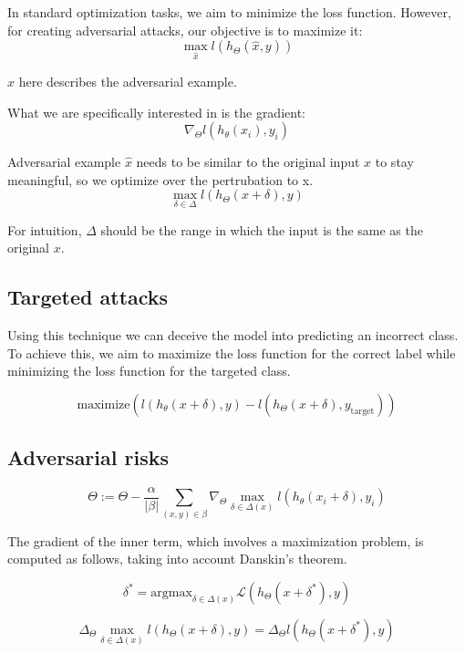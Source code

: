 In standard optimization tasks, we aim to minimize the loss function. However, for creating adversarial attacks, our objective is to maximize it:
\[\max_{\hat{x}} l(h_{\Theta}(\hat{x}, y))\]

$\hat x$ here describes the adversarial example.

What we are specifically interested in is the gradient:
\[  \nabla_\Theta l (h_{\theta}(x_{i}), y_{i}) \]

Adversarial example $\hat{x}$ needs to be similar to the original input $x$ to stay meaningful, so we optimize over the pertrubation to x.
\[\max_{\delta \in \Delta} l (h_{\Theta}(x+\delta), y)\]

For intuition, $\Delta$ should be the range in which the input is the same as the original $x$.


\subsection{Targeted attacks}
Using this technique we can deceive the model into predicting an incorrect class. To achieve this, we aim to maximize the loss function for the correct label while minimizing the loss 
function for the targeted class. 

\[\text{maximize} \left( l(h_{\theta}(x + \delta), y) - l(h_{\Theta}(x + \delta), y_{\text{target}}) \right)
\]


\subsection{Adversarial risks}

\[ \Theta := \Theta - \dfrac{\alpha}{|\beta|} \sum_{(x, y) \in \beta} \nabla_\Theta \max_{\delta \in \Delta(x)} l (h_{\theta}(x_{i}+\delta), y_{i}) \]


The gradient of the inner term, which involves a maximization problem, is computed as follows, taking into account Danskin's theorem.%

\[\delta^* = \text{argmax}_{\delta \in \Delta(x)} \mathcal{L}(h_{\Theta}(x + \delta^*), y)\]

\[\Delta_\Theta \max_{\delta \in \Delta(x)} l (h_\Theta(x+\delta), y) = \Delta_\Theta l (h_\Theta(x + \delta^*), y)\]